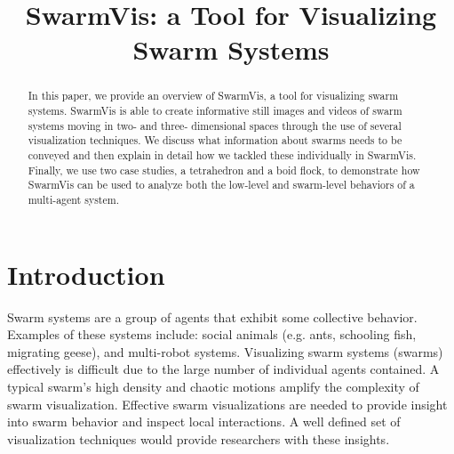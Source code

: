\documentclass[conference]{IEEEtran}
\begin{document}
\title{SwarmVis: a Tool for Visualizing Swarm Systems}

\author{
\and
{}
}
\maketitle


\begin{abstract}
In this paper, we provide an overview of SwarmVis, a tool for visualizing swarm systems. SwarmVis is able to create informative still images and videos of swarm systems moving in two- and three- dimensional spaces through the use of several visualization techniques. We discuss what information about swarms needs to be conveyed and then explain in detail how we tackled these individually in SwarmVis. Finally, we use two case studies, a tetrahedron and a boid flock, to demonstrate how SwarmVis can be used to analyze both the low-level and swarm-level behaviors of a multi-agent system.


\end{abstract}

\section{Introduction}
Swarm systems are a group of agents that exhibit some collective behavior. Examples of these systems include: social animals (e.g. ants\cite{couzin2003sol}, schooling fish\cite{parrish2002sof}, migrating geese\cite{reynolds1987}), 
and multi-robot systems\cite{mondada2004sbn}\cite{mclurkin2004srt}.
Visualizing swarm systems (swarms) effectively is difficult due to the large number of individual agents contained. A typical swarm's high density and chaotic motions amplify the complexity of swarm visualization. Effective swarm visualizations are needed to provide insight into swarm behavior and inspect local interactions.
A well defined set of visualization techniques would provide researchers with these insights.
\end{document}
